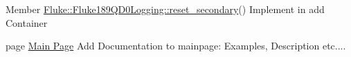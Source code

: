 \begin{DoxyDescription}
\item[Member \hyperlink{classFluke_1_1Fluke189QD0Logging_ac5205e2183bdfffcd46229b71baeb3fb}{Fluke::Fluke189QD0Logging::reset\_\-secondary}() ]Implement in add Container 
\end{DoxyDescription}

\label{todo__todo000001}
\hypertarget{todo__todo000001}{}
 
\begin{DoxyDescription}
\item[page \hyperlink{index}{Main Page} ]Add Documentation to mainpage: Examples, Description etc....


\end{DoxyDescription}